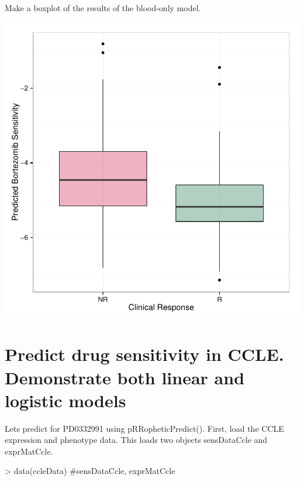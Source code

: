 \documentclass[a4paper]{article}
\begin{document}
Make a boxplot of the results of the blood-only model.
\begin{Schunk}
\end{Schunk}
\includegraphics{vignetteOutline-008}

\section{Predict drug sensitivity in CCLE. Demonstrate both linear and logistic models}

Lets predict for PD0332991 using pRRopheticPredict(). First, load the CCLE expression and phenotype data. This loads two objects sensDataCcle and exprMatCcle.
\begin{Schunk}
\begin{Sinput}
> data(ccleData) #sensDataCcle, exprMatCcle
\end{Sinput}
\end{Schunk}
\end{document}
